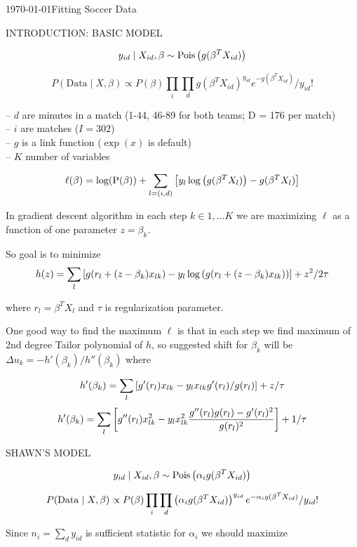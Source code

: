 \documentclass[12pt, letter]{article}
\begin{document}
{\sc\today \hfill \Large Fitting Soccer Data\\[.2cm]}

%

%

%


{\LARGE INTRODUCTION: BASIC MODEL}

$$y_{id}\mid X_{id}, \beta \sim \mathrm{Pois}\zag{g(\beta^T X_{id})}$$

$$P(\mathrm{Data}\mid X, \beta) \propto P(\beta) \prod_i \prod_d 
    g(\beta^T X_{id})^{y_{id}} e^{-g(\beta^T X_{id})}/y_{id}!$$

   -- $d$ are minutes in a match (1-44, 46-89 for both teams; D = 176 per match)\\
   -- $i$ are matches ($I=302$)\\
   -- $g$ is a link function ($\exp(x)$ is default)\\
   -- $K$ number of variables

$$\ell(\beta) = \log(\mathrm{P(\beta)}) + \sum_{l=(i,d)} \zags{y_l\log\zag{g(\beta^T X_l)} - g(\beta^T X_l)}$$

In gradient descent algorithm in each step $k \in 1,\dots K$ we are maximizing $\ell$ as a function of one parameter $z=\beta_k$.

So goal is to minimize
$$h(z) = \sum_l \zags{g(r_l + (z-\beta_k)x_{lk}) - y_l\log\zag{g(r_l + (z-\beta_k)x_{lk})}} + z^2/2\tau$$

where $r_l = \beta^T X_l$ and $\tau$ is regularization parameter.

One good way to find the maximum $\ell$ is that in each step we find maximum of 2nd degree Tailor polynomial of $h$, so suggested shift for $\beta_k$ will be $\Delta u_k = -h'(\beta_k)/h''(\beta_k)$ where

$$h'(\beta_k) = \sum_l \zags{g'(r_l)x_{lk} - y_l x_{lk} g'(r_l)/g(r_l)} + z/\tau$$
$$h'(\beta_k) = \sum_l \zags{g''(r_l)x_{lk}^2 - y_l x_{lk}^2 \frac{g''(r_l)g(r_l) - g'(r_l)^2}{g(r_l)^2}} + 1/\tau$$


\newpage
{\LARGE SHAWN'S MODEL}

$$y_{id}\mid X_{id}, \beta \sim \mathrm{Pois}\zag{\alpha_i g(\beta^T X_{id})}$$

$$P(\mathrm{Data}\mid X, \beta) \propto P(\beta) \prod_i \prod_d
    \zag{\alpha_i g(\beta^T X_{id})}^{y_{id}} e^{-\alpha_i g(\beta^T X_{id})}/y_{id}!$$

Since $n_i = \sum_d y_{id}$ is sufficient statistic for $\alpha_i$ we should maximize
\end{document}
